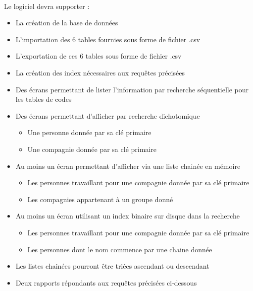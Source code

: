 \documentclass{article}
\begin{document}
    \paragraph{}
    Le logiciel devra supporter :
    \begin{itemize}[label=$\bullet$]
        \item La création de la base de données
        \item L’importation des 6 tables fournies sous forme de fichier .csv
        \item L’exportation de ces 6 tables sous forme de fichier .csv
        \item La création des index nécessaires aux requêtes précisées
        \item Des écrans permettant de lister l’information par recherche séquentielle pour les tables de codes
        \item Des écrans permettant d’afficher par recherche dichotomique
        \begin{itemize}[label=$\circ$]
            \item Une personne donnée par sa clé primaire
            \item Une compagnie donnée par sa clé primaire
        \end{itemize}
        \item Au moins un écran permettant d’afficher via une liste chainée en mémoire
        \begin{itemize}[label=$\circ$]
            \item Les personnes travaillant pour une compagnie donnée par sa clé primaire
            \item Les compagnies appartenant à un groupe donné
        \end{itemize}
        \item Au moins un écran utilisant un index binaire sur disque dans la recherche
        \begin{itemize}[label=$\circ$]
            \item Les personnes travaillant pour une compagnie donnée par sa clé primaire
            \item Les personnes dont le nom commence par une chaine donnée
        \end{itemize}
        \item Les listes chainées pourront être triées ascendant ou descendant
        \item Deux rapports répondants aux requêtes précisées ci-dessous
    \end{itemize}
\end{document}
